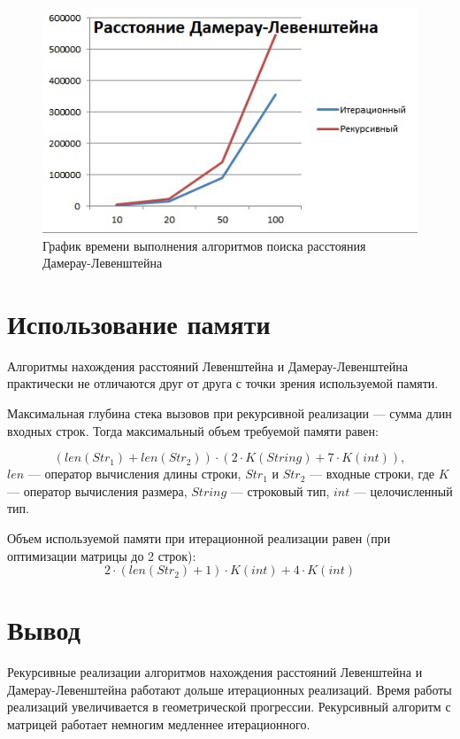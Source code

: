 \documentclass[12pt]{report}
\begin{document}
    \begin{figure}[H]
        \centering
        \includegraphics[scale=0.75]{img/levDamGraphic}
        \caption{График времени выполнения алгоритмов поиска расстояния Дамерау-Левенштейна}
        \label{fig:levDamGraphic}
    \end{figure}

    \section{Использование памяти}
    Алгоритмы нахождения расстояний Левенштейна и Дамерау-Левенштейна практически
    не отличаются друг от друга с точки зрения используемой памяти.

    Максимальная глубина стека вызовов при рекурсивной реализации --- сумма длин входных строк.
    Тогда максимальный объем требуемой памяти равен:

    \begin{equation}
        (len(Str_{1}) + len(Str_{2})) \cdot
        (2 \cdot K(String) + 7 \cdot K(int)),
    \end{equation}
    $len$ --- оператор вычисления длины строки,
    $Str_{1}$ и $Str_{2}$ --- входные строки,
    где $K$ --- оператор вычисления размера,
    $String$ --- строковый тип, $int$ --- целочисленный тип.

    Объем используемой памяти при итерационной реализации равен (при оптимизации матрицы до 2 строк):
    \begin{equation}
        2 \cdot (len(Str_{2}) + 1) \cdot K(int) +
        4 \cdot K(int)
    \end{equation}


    \section{Вывод}
    Рекурсивные реализации алгоритмов нахождения расстояний Левенштейна и Дамерау-Левенштейна
    работают дольше итерационных реализаций.
    Время работы реализаций увеличивается в геометрической прогрессии.
    Рекурсивный алгоритм с матрицей работает немногим медленнее итерационного.
\end{document}
